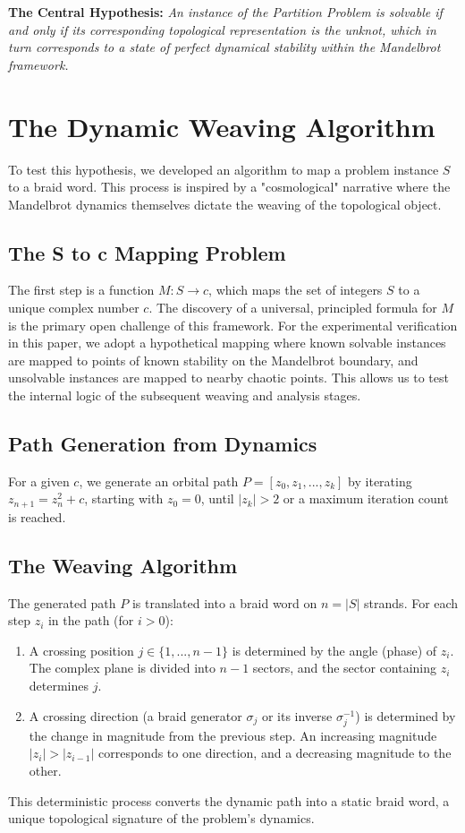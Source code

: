 \documentclass[11pt, a4paper]{article}
\begin{document}
\vspace{1em}
\noindent\textbf{The Central Hypothesis:} \emph{An instance of the Partition Problem is solvable if and only if its corresponding topological representation is the unknot, which in turn corresponds to a state of perfect dynamical stability within the Mandelbrot framework.}

\section{The Dynamic Weaving Algorithm}

To test this hypothesis, we developed an algorithm to map a problem instance $S$ to a braid word. This process is inspired by a "cosmological" narrative where the Mandelbrot dynamics themselves dictate the weaving of the topological object.

\subsection{The S to c Mapping Problem}
The first step is a function $M: S \to c$, which maps the set of integers $S$ to a unique complex number $c$. The discovery of a universal, principled formula for $M$ is the primary open challenge of this framework. For the experimental verification in this paper, we adopt a hypothetical mapping where known solvable instances are mapped to points of known stability on the Mandelbrot boundary, and unsolvable instances are mapped to nearby chaotic points. This allows us to test the internal logic of the subsequent weaving and analysis stages.

\subsection{Path Generation from Dynamics}
For a given $c$, we generate an orbital path $P = [z_0, z_1, ..., z_k]$ by iterating $z_{n+1} = z_n^2 + c$, starting with $z_0 = 0$, until $|z_k| > 2$ or a maximum iteration count is reached.

\subsection{The Weaving Algorithm}
The generated path $P$ is translated into a braid word on $n = |S|$ strands. For each step $z_i$ in the path (for $i > 0$):
\begin{enumerate}
    \item A crossing position $j \in \{1, ..., n-1\}$ is determined by the angle (phase) of $z_i$. The complex plane is divided into $n-1$ sectors, and the sector containing $z_i$ determines $j$.
    \item A crossing direction (a braid generator $\sigma_j$ or its inverse $\sigma_j^{-1}$) is determined by the change in magnitude from the previous step. An increasing magnitude $|z_i| > |z_{i-1}|$ corresponds to one direction, and a decreasing magnitude to the other.
\end{enumerate}
This deterministic process converts the dynamic path into a static braid word, a unique topological signature of the problem's dynamics.
\end{document}
